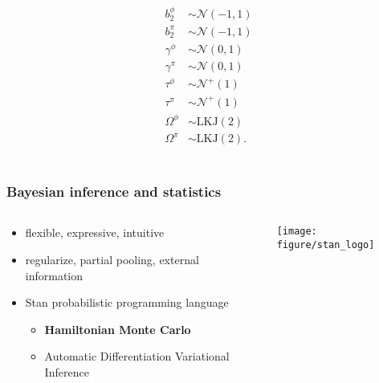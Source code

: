 \documentclass{beamer}
\begin{document}
\begin{frame}
\begin{center}
\begin{scriptsize}
\begin{columns}
\begin{column}{0.5\textwidth}
\begin{align*}
            b^{\phi}_{2} &\sim \mathcal{N}(-1, 1) \\
            b^{\pi}_{2} &\sim \mathcal{N}(-1, 1) \\
            \gamma^{\phi} &\sim \mathcal{N}(0, 1) \\
            \gamma^{\pi} &\sim \mathcal{N}(0, 1) \\
            \tau^{\phi} &\sim \mathcal{N}^{+}(1) \\
            \tau^{\pi} &\sim \mathcal{N}^{+}(1) \\
            \Omega^{\phi} &\sim \text{LKJ}(2) \\
            \Omega^{\pi} &\sim \text{LKJ}(2). \\
          \end{align*}
        \end{column}
      \end{columns}
    \end{scriptsize} 
  \end{center}
\end{frame}

%


\begin{frame}
  \frametitle{Bayesian inference and statistics}

  \begin{columns}
    \begin{column}{0.45\textwidth}
      \begin{itemize}
        \item flexible, expressive, intuitive
        \item regularize, partial pooling, external information
        \item Stan probabilistic programming language
          \begin{itemize}
            \item \textbf{Hamiltonian Monte Carlo}
            \item Automatic Differentiation Variational Inference
          \end{itemize}
      \end{itemize}
    \end{column}
    \begin{column}{0.55\textwidth}
      \texttt{[image: figure/stan\_logo]}
    \end{column}
  \end{columns}
\end{frame}
\end{document}
